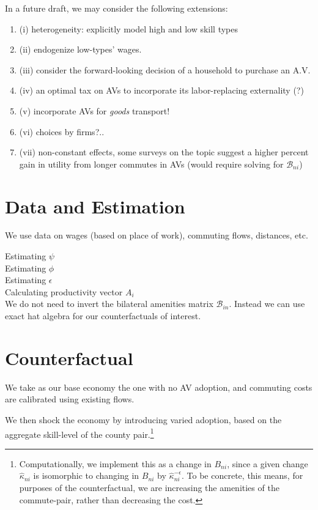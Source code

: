 \documentclass{article}
\begin{document}
In a future draft, we may consider the following extensions: 
\begin{enumerate}
\item  (i) heterogeneity: explicitly model high and low skill types
 \item (ii) endogenize low-types' wages.
\item (iii) consider the forward-looking decision of a household to purchase an A.V.
\item (iv) an optimal tax on AVs to incorporate its labor-replacing externality (?)
\item (v) incorporate AVs for \textit{goods} transport!
\item (vi) choices by firms?..
\item (vii) non-constant effects, some surveys on the topic suggest a higher percent gain in utility from longer commutes in AVs (would require solving for $\mathcal{B}_{ni}$)
\end{enumerate}



\section{Data and Estimation}
We use data on wages (based on place of work), commuting flows, distances, etc.



Estimating $\psi$ \\
Estimating $\phi$ \\ 
Estimating $\epsilon$ \\
Calculating productivity vector $A_i$ \\


We do not need to invert the bilateral amenities matrix $\mathcal{B}_{in}$. Instead we can use exact hat algebra for our counterfactuals of interest. 




\section{Counterfactual}

We take as our base economy the one with no AV adoption, and commuting costs are calibrated using existing flows.

We then shock the economy by introducing varied adoption, based on the aggregate skill-level of the county pair.\footnote{Computationally, we implement this as a change in  $B_{ni}$, since a given change $\hat \kappa_{ni}$ is isomorphic to changing in $B_{ni}$ by $\hat \kappa_{ni}^{-\epsilon}$. To be concrete, this means, for purposes of the counterfactual, we are increasing the amenities of the commute-pair, rather than decreasing the cost.}
\end{document}
